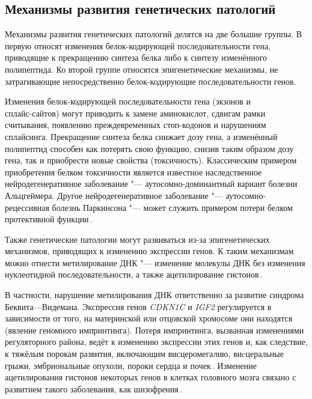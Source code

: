\documentclass[a4paper,14pt]{extarticle}
\newcommand{\genename}[1]{\textit{#1}}
\newcommand{\ecitep}[1]{\textenglish{\citep{#1}}}
\begin{document}
\subsection{Механизмы развития генетических патологий}

Механизмы развития генетических патологий делятся на две большие группы.
В первую относят изменения белок-кодирующей последовательности гена, приводящие к прекращению синтеза белка либо к синтезу изменённого полипептида.
Ко второй группе относятся эпигенетические механизмы, не затрагивающие непосредственно белок-кодирующие последовательности генов.

Изменения белок-кодирующей последовательности гена (экзонов и\\сплайс-сайтов) могут приводить к замене аминокислот, сдвигам рамки считывания, появлению преждевременных стоп-кодонов и нарушениям сплайсинга.
Прекращение синтеза белка снижает дозу гена, а изменённый полипептид способен как потерять свою функцию, снизив таким образом дозу гена, так и приобрести новые свойства (токсичность).
Классическим примером приобретения белком токсичности является известное наследственное нейродегенеративное заболевание "--- аутосомно\hyp{}доминантный вариант болезни Альцгеймера.
Другое нейродегенеративное заболевание "--- аутосомно\hyp{}рецессивная болезнь Паркинсона "--- может служить примером потери белком протективной функции\,\ecitep{Winklhofer_2008}.

Также генетические патологии могут развиваться из-за эпигенетических механизмов, приводящих к изменению экспрессии генов.
К таким механизмам можно отнести метилирование ДНК "--- изменение молекулы ДНК без изменения нуклеотидной последовательности, а также ацетилирование гистонов\,\ecitep{Handy_2011}.

В частности, нарушение метилирования ДНК ответственно за развитие синдрома Беквита---Видемана.
Экспрессия генов \genename{CDKN1C} и \genename{IGF2} регулируется в зависимости от того, на материнской или отцовской хромосоме они находятся (явление геномного импринтинга).
Потеря импринтинга, вызванная изменениями регуляторного района, ведёт к изменению экспрессии этих генов и, как следствие, к тяжёлым порокам развития, включающим висцеромегалию, виcцеральные грыжи, эмбриональные опухоли, пороки сердца и почек\,\ecitep{Jin_2018}.
Изменение ацетилирования гистонов некоторых генов в клетках головного мозга связано с развитием такого заболевания, как шизофрения\,\ecitep{Tang_2011}.
\end{document}
